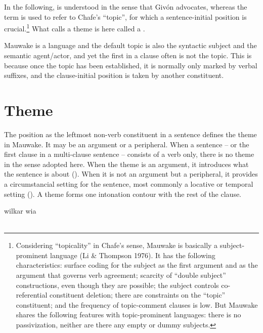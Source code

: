 In the following,  is understood in the sense that Giv\'on advocates, whereas the term  is used to refer to Chafe's ``topic'', for which a sentence-initial position is crucial.\footnote{Considering ``topicality'' in Chafe's sense, Mauwake is basically a subject-prominent language (Li \& Thompson 1976). It has the following characteristics: surface coding for the subject as the first argument and as the argument that governs verb agreement; scarcity of ``double subject'' constructions, even though they are possible; the subject controls co-referential constituent deletion; there are constraints on the ``topic'' constituent; and the frequency of topic-comment clauses is low. But Mauwake shares the following  features with topic-prominent languages: there is no passivization, neither are there any empty or dummy subjects.} What \citet[19]{Dik1978} calls a theme is here called a .

Mauwake is a  language and the default topic is also the syntactic subject and the semantic agent/actor, and yet the first  in a clause often is not the topic. This is because once the topic has been established, it is normally only marked by verbal suffixes, and the clause-initial position is taken by another constituent.  

\section{Theme}
\hypertarget{RefHeading23781935131865}{}
The position as the leftmost non-verb constituent in a sentence defines the theme in Mauwake. It may be an argument or a peripheral. When a sentence -- or the first clause in a multi-clause sentence -- consists of a verb only, there is no theme in the sense adopted here. When the theme is an argument, it introduces what the sentence is about (). When it is not an argument but a peripheral, it provides a circumstancial setting for the sentence, most commonly a locative or temporal setting (). A theme forms one intonation contour with the rest of the clause. 

\ea%
\label{ex:x1908}
\gll {}    wilkar  wia  \\
      \\
\glt
\z

